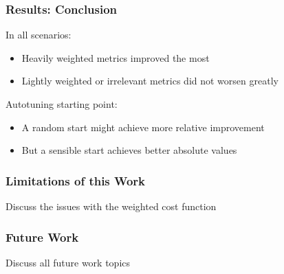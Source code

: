 \documentclass[10pt, compress, xcolor={table,xcdraw,usenames}, aspectratio=169]{beamer}
\begin{document}
\begin{frame}
    \frametitle{Results: Conclusion}
    \begin{block}{In all scenarios:}
        \begin{itemize}
            \item Heavily weighted metrics \alert{improved the most}
            \item Lightly weighted or irrelevant metrics \alert{did not worsen
                greatly}
        \end{itemize}
    \end{block}

    \pause

    \begin{block}{Autotuning starting point:}
        \begin{itemize}
            \item A random start \alert{might achieve more relative
                improvement}
            \item But a sensible start \alert{achieves better absolute values}
        \end{itemize}
    \end{block}
\end{frame}

\begin{frame}
    \frametitle{Limitations of this Work}
    \begin{block}{Discuss the issues with the weighted cost function}
    \end{block}
\end{frame}

\begin{frame}
    \frametitle{Future Work}
    \begin{block}{Discuss all future work topics}
    \end{block}
\end{frame}

\maketitle
\end{document}
